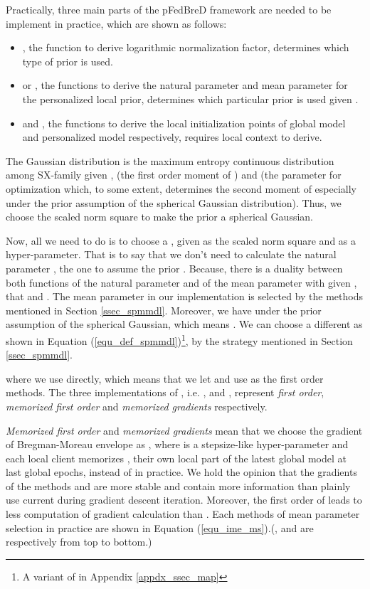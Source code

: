 \documentclass{article}
\begin{document}
Practically, three main parts of the pFedBreD framework are needed to be implement in practice, which are shown as follows:
\begin{itemize}
    \item , the function to derive logarithmic normalization factor, determines which type of prior is used.
    \item  or , the functions to derive the natural parameter and mean parameter for the personalized local prior, determines which particular prior is used given .
    \item  and , the functions to derive the local initialization points of global model and personalized model respectively, requires local context  to derive.
\end{itemize}

The Gaussian distribution is the maximum entropy continuous distribution among SX-family given ,  (the first order moment of ) and  (the parameter for optimization which, to some extent, determines the second moment of  especially under the prior assumption of the spherical Gaussian distribution). Thus, we choose the scaled norm square  to make the prior a spherical Gaussian.

Now, all we need to do is to choose a , given  as the scaled norm square and  as a hyper-parameter. That is to say that we don't need to calculate the natural parameter , the one to assume the prior . Because, there is a duality between both functions  of the natural parameter and  of the mean parameter with given , that  and . The mean parameter  in our implementation is selected by the methods mentioned in Section \ref{ssec_spmmdl}. Moreover, we have  under the prior assumption of the spherical Gaussian, which means . We can choose a different  as shown in Equation (\ref{equ_def_spmmdl})\footnote{A variant of  in Appendix \ref{appdx_ssec_map}}, by  the strategy mentioned in Section \ref{ssec_spmmdl}.

where we use  directly, which means that we let  and use  as the first order methods. The three implementations of , i.e. ,  and , represent \textit{first order}, \textit{memorized first order} and \textit{memorized gradients} respectively.

\textit{Memorized first order} and \textit{memorized gradients} mean that we choose  the gradient of Bregman-Moreau envelope as , where  is a stepsize-like hyper-parameter and each local client memorizes , their own local part of the latest global model  at last global epochs, instead of  in practice. We hold the opinion that the gradients of the methods  and  are more stable and contain more information than plainly use current  during gradient descent iteration. Moreover, the first order of  leads to less computation of gradient calculation than . Each methods of mean parameter selection in practice are shown in Equation (\ref{equ_ime_ms}).(,  and  are respectively from top to bottom.)
\end{document}
